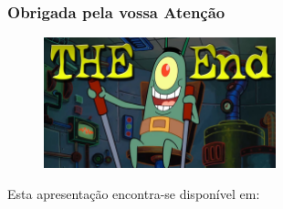 \documentclass[hyperref={pdfpagelabels=true}]{beamer}
\begin{document}
\begin{frame}
\frametitle{Obrigada pela vossa Aten\c{c}\~{a}o}
    \begin{figure}   
      \includegraphics[width=0.6\textwidth]{end.jpg}      
    \end{figure}   
    Esta apresenta\c{c}\~{a}o encontra-se dispon\'{i}vel em: 
      \vspace{5mm}    
\end{frame}
\end{document}
